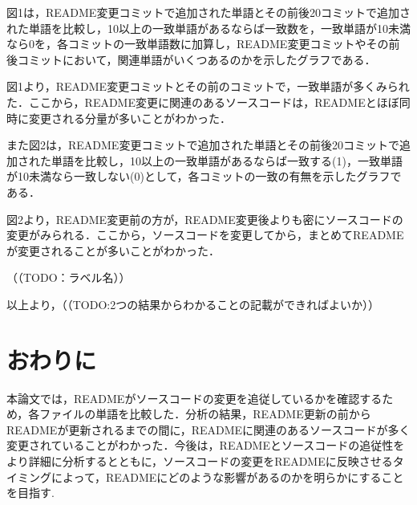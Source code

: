 \documentclass[uplatex,dvipdfmx,a4paper,twocolumn,base=11pt,jbase=11pt,ja=standard]{bxjsarticle}  %
\begin{document}

図1は，README変更コミットで追加された単語とその前後20コミットで追加された単語を比較し，10以上の一致単語があるならば一致数を，一致単語が10未満なら0を，各コミットの一致単語数に加算し，README変更コミットやその前後コミットにおいて，関連単語がいくつあるのかを示したグラフである．

図1より，README変更コミットとその前のコミットで，一致単語が多くみられた．ここから，README変更に関連のあるソースコードは，READMEとほぼ同時に変更される分量が多いことがわかった．

また図2は，README変更コミットで追加された単語とその前後20コミットで追加された単語を比較し，10以上の一致単語があるならば一致する(1)，一致単語が10未満なら一致しない(0)として，各コミットの一致の有無を示したグラフである．

図2より，README変更前の方が，README変更後よりも密にソースコードの変更がみられる．ここから，ソースコードを変更してから，まとめてREADMEが変更されることが多いことがわかった．

（（TODO：ラベル名））

以上より，（（TODO:2つの結果からわかることの記載ができればよいか））





\section{おわりに}




本論文では，READMEがソースコードの変更を追従しているかを確認するため，各ファイルの単語を比較した．分析の結果，README更新の前からREADMEが更新されるまでの間に，READMEに関連のあるソースコードが多く変更されていることがわかった．今後は，READMEとソースコードの追従性をより詳細に分析するとともに，ソースコードの変更をREADMEに反映させるタイミングによって，READMEにどのような影響があるのかを明らかにすることを目指す.
\end{document}

